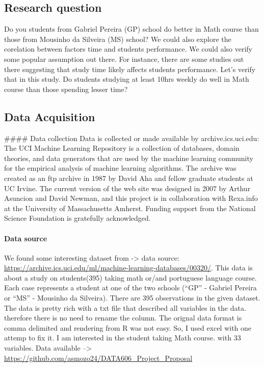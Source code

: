 \documentclass[
]{article}
\begin{document}
\hypertarget{research-question}{%
\subsection{Research question}\label{research-question}}

Do you students from Gabriel Pereira (GP) school do better in Math
course than those from Mousinho da Silveira (MS) school? We could also
explore the corelation between factors time and students performance. We
could also verify some popular assumption out there. For instance, there
are some studies out there suggesting that study time likely affects
students performance. Let's verify that in this study. Do students
studying at least 10hrs weekly do well in Math course than those
spending lesser time?

\hypertarget{data-acquisition}{%
\subsection{Data Acquisition}\label{data-acquisition}}

\#\#\#\# Data collection Data is collected or made available by
archive.ics.uci.edu: The UCI Machine Learning Repository is a collection
of databases, domain theories, and data generators that are used by the
machine learning community for the empirical analysis of machine
learning algorithms. The archive was created as an ftp archive in 1987
by David Aha and fellow graduate students at UC Irvine. The current
version of the web site was designed in 2007 by Arthur Asuncion and
David Newman, and this project is in collaboration with Rexa.info at the
University of Massachusetts Amherst. Funding support from the National
Science Foundation is gratefully acknowledged.

\hypertarget{data-source}{%
\paragraph{Data source}\label{data-source}}

We found some interesting dataset from -\textgreater{} data source:
\url{https://archive.ics.uci.edu/ml/machine-learning-databases/00320/}.
This data is about a study on students(395) taking math or/and
portuguese language course. Each case represents a student at one of the
two schools (``GP'' - Gabriel Pereira or ``MS'' - Mousinho da Silveira).
There are 395 observations in the given dataset. The data is pretty rich
with a txt file that described all variables in the data. therefore
there is no need to rename the column. The orignal data format is comma
delimited and rendering from R was not easy. So, I used excel with one
attemp to fix it. I am interested in the student taking Math course.
with 33 variables. Data available --\textgreater{}
\url{https://github.com/asmozo24/DATA606_Project_Proposal}
\end{document}
